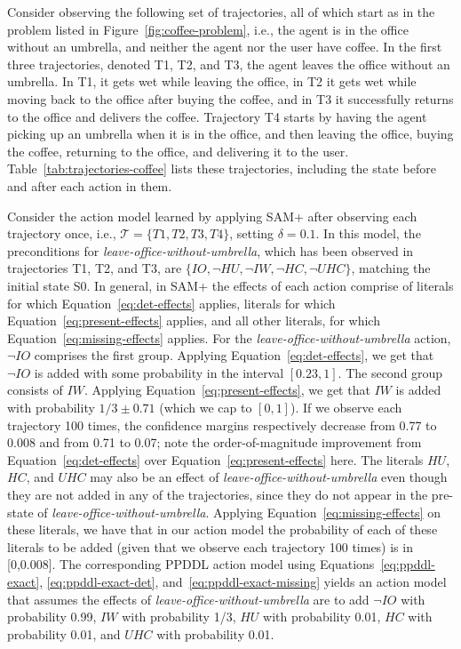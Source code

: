 \documentclass[letterpaper]{article} %
\newcommand{\leaveofficewithoutumbrella}{\textit{leave-office-without-umbrella}\xspace}
\begin{document}
Consider observing the following set of trajectories, all of which start as in the problem listed in Figure~\ref{fig:coffee-problem}, i.e., the agent is in the office without an umbrella, and neither the agent nor the user have coffee. 
In the first three trajectories, denoted T1, T2, and T3, the agent leaves the office without an umbrella. In T1, it gets wet while leaving the office, in T2 it gets wet while moving back to the office after buying the coffee, and in T3 it successfully returns to the office and delivers the coffee. 
Trajectory T4 starts by having the agent picking up an umbrella when it is in the office, and then leaving the office, buying the coffee, returning to the office, and delivering it to the user. Table~\ref{tab:trajectories-coffee} lists these trajectories, including the state before and after each action in them. 



Consider the action model learned by applying SAM+ 
after observing each trajectory once, i.e., $\mathcal{T}=\{T1,T2,T3,T4\}$, setting $\delta=0.1$. 
In this model, the preconditions for \leaveofficewithoutumbrella, which has been observed in trajectories T1, T2, and T3, are $\{IO, \neg HU, \neg IW, \neg HC, \neg UHC\}$, matching the initial state S0. 
In general, in SAM+ the effects of each action comprise of literals for which Equation~\ref{eq:det-effects} applies, literals for which Equation~\ref{eq:present-effects} applies, and all other literals, for which  Equation~\ref{eq:missing-effects} applies. 
For the \leaveofficewithoutumbrella action, $\neg IO$ comprises the first group. Applying Equation~\ref{eq:det-effects}, we get that $\neg IO$ is added with some probability in the interval $[0.23,1]$.
The second group consists of $IW$. 
Applying Equation~\ref{eq:present-effects}, we get that 
$IW$ is added with probability $1/3\pm 0.71$ (which we cap to $[0,1]$). 
If we observe each trajectory 100 times, the confidence margins respectively decrease from 0.77 to 0.008 and from 0.71 to 0.07; note the order-of-magnitude improvement from Equation~\ref{eq:det-effects} over Equation~\ref{eq:present-effects} here. 
The literals $HU$, $HC$, and $UHC$ may also be an effect of \leaveofficewithoutumbrella even though they are not added in any of the trajectories, since they do not appear in the pre-state of \leaveofficewithoutumbrella.   
Applying Equation~\ref{eq:missing-effects} on these literals, we have that in our action model the probability of each of these literals to be added (given that we observe each trajectory 100 times) is in [0,0.008]. 
The corresponding PPDDL action model using Equations~\ref{eq:ppddl-exact}, \ref{eq:ppddl-exact-det}, and~\ref{eq:ppddl-exact-missing} yields an action model that assumes 
the effects of \leaveofficewithoutumbrella are to add $\neg IO$ with probability 0.99,
$IW$ with probability 1/3,
$HU$ with probability 0.01,
$HC$ with probability 0.01, 
and $UHC$ with probability 0.01. 
\end{document}
